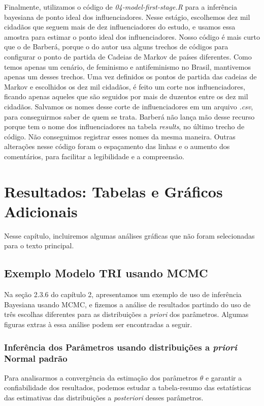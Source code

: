 \documentclass[
	12pt,				%
	openright,			%
	twoside,			%
	a4paper,			%
	english,			%
	brazil				%
	]{abntex2}
\begin{document}
\begin{anexosenv}
 Finalmente, utilizamos o código de \textit{04-model-first-stage.R} para a inferência bayesiana de ponto ideal dos influenciadores. Nesse estágio, escolhemos dez mil cidadãos que seguem mais de dez influenciadores do estudo, e usamos essa amostra para estimar o ponto ideal dos influenciadores. Nosso código é mais curto que o de Barberá, porque o do autor usa alguns trechos de códigos para configurar o ponto de partida de Cadeias de Markov de países diferentes. Como temos apenas um cenário, de feminismo e antifeminismo no Brasil, mantivemos apenas um desses trechos. Uma vez definidos os pontos de partida das cadeias de Markov e escolhidos os dez mil cidadãos, é feito um corte nos influenciadores, ficando apenas aqueles que são seguidos por mais de duzentos entre os dez mil cidadãos. Salvamos os nomes desse corte de influenciadores em um arquivo \textit{.csv}, para conseguirmos saber de quem se trata. Barberá não lança mão desse recurso porque tem o nome dos influenciadores na tabela \textit{results}, no último trecho de código. Não conseguimos registrar esses nomes da mesma maneira. Outras alterações nesse código foram o espaçamento das linhas e o aumento dos comentários, para facilitar a legibilidade e a compreensão.
 
 \chapter{Resultados: Tabelas e Gráficos Adicionais}\label{figurascompletas}
 Nesse capítulo, incluiremos algumas análises gráficas que não foram selecionadas para o texto principal.
 
 \section{Exemplo Modelo TRI usando MCMC}\label{trimcmcextra}
 Na seção 2.3.6 do capítulo 2, apresentamos um exemplo de uso de inferência Bayesiana usando MCMC, e fizemos a análise de resultados partindo do uso de três escolhas diferentes para as distribuições a \textit{priori} dos parâmetros. Algumas figuras extras à essa análise podem ser encontradas a seguir.
 
 \subsection{Inferência dos Parâmetros usando distribuições a \emph{priori} Normal padrão}\label{extrapadrao}
 Para analisarmos a convergência da estimação dos parâmetros $\theta$ e garantir a confiabilidade dos resultados, podemos estudar a tabela-resumo das estatísticas das estimativas das distribuições a \textit{posteriori} desses parâmetros.
 

\end{anexosenv}
\end{document}
